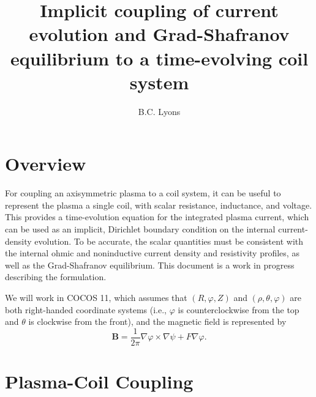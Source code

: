 \documentclass[reprint,onecolumn,amsmath,aip,pop,letterpaper, 11pt]{revtex4-1}
\newcommand{\bB}{\mathbf{B}}
\begin{document}
\title{Implicit coupling of current evolution and Grad-Shafranov equilibrium to a time-evolving coil system}

\author{B.C. Lyons}

\maketitle

\section{Overview}
\label{sec:overview}

For coupling an axisymmetric plasma to a coil system, it can be useful to represent the plasma a single coil, with scalar resistance,  inductance,  and voltage.  This provides a time-evolution equation for the integrated plasma current, which can be used as an implicit, Dirichlet boundary condition on the internal current-density evolution. To be accurate, the scalar quantities must be consistent with the internal ohmic and noninductive current density and resistivity profiles,  as well as the Grad-Shafranov equilibrium.  This document is a work in progress describing the formulation.  

We will work in COCOS 11,  which assumes that $\left(R, \varphi,Z\right)$ and $\left(\rho, \theta, \varphi\right)$ are both right-handed coordinate systems (i.e.,  $\varphi$ is counterclockwise from the top and $\theta$ is clockwise from the front), and the magnetic field is represented by
\begin{equation}
\bB = \frac{1}{2\pi}\nabla\varphi\times\nabla\psi + F\nabla\varphi. \label{eq:Bfield}
\end{equation}

\section{Plasma-Coil Coupling}
\label{sec:coupling}
\end{document}
